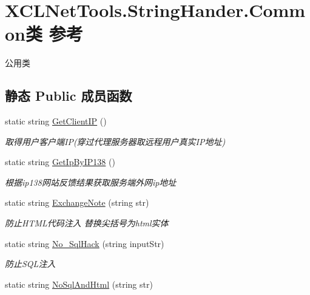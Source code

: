 \hypertarget{class_x_c_l_net_tools_1_1_string_hander_1_1_common}{\section{X\-C\-L\-Net\-Tools.\-String\-Hander.\-Common类 参考}
\label{class_x_c_l_net_tools_1_1_string_hander_1_1_common}
}


公用类  


\subsection*{静态 Public 成员函数}
\begin{DoxyCompactItemize}
\item 
static string \hyperlink{class_x_c_l_net_tools_1_1_string_hander_1_1_common_acafb8bdf0d2e6eaa773fdf629a042c5d}{Get\-Client\-I\-P} ()
\begin{DoxyCompactList}\small\item\em 取得用户客户端\-I\-P(穿过代理服务器取远程用户真实\-I\-P地址) \end{DoxyCompactList}\item 
static string \hyperlink{class_x_c_l_net_tools_1_1_string_hander_1_1_common_a7153288a984725f639c034a3b069cce3}{Get\-Ip\-By\-I\-P138} ()
\begin{DoxyCompactList}\small\item\em 根据ip138网站反馈结果获取服务端外网ip地址 \end{DoxyCompactList}\item 
static string \hyperlink{class_x_c_l_net_tools_1_1_string_hander_1_1_common_af6ad14eae24704cda11cc498849d9737}{Exchange\-Note} (string str)
\begin{DoxyCompactList}\small\item\em 防止\-H\-T\-M\-L代码注入 替换尖括号为html实体 \end{DoxyCompactList}\item 
static string \hyperlink{class_x_c_l_net_tools_1_1_string_hander_1_1_common_accef3263e7a42ba85bc76477e95f42f9}{No\-\_\-\-Sql\-Hack} (string input\-Str)
\begin{DoxyCompactList}\small\item\em 防止\-S\-Q\-L注入 \end{DoxyCompactList}\item 
static string \hyperlink{class_x_c_l_net_tools_1_1_string_hander_1_1_common_a67d87071f6b40c184fd81a6f2e5e923e}{No\-Sql\-And\-Html} (string str)

\end{DoxyCompactItemize}
